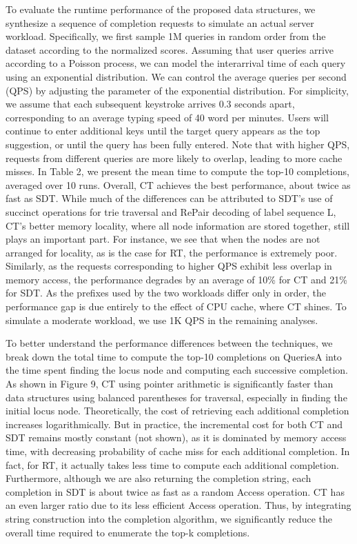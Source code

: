 \documentclass{sig-alternate}
\begin{document}
To evaluate the runtime performance of the proposed data
structures, we synthesize a sequence of completion requests
to simulate an actual server workload. Specifically, we first
sample 1M queries in random order from the dataset according
to the normalized scores. Assuming that user queries
arrive according to a Poisson process, we can model the interarrival
time of each query using an exponential distribution.
We can control the average queries per second (QPS) by
adjusting the  parameter of the exponential distribution.
For simplicity, we assume that each subsequent keystroke
arrives 0.3 seconds apart, corresponding to an average typing
speed of 40 word per minutes. Users will continue to enter
additional keys until the target query appears as the top
suggestion, or until the query has been fully entered. Note
that with higher QPS, requests from different queries are
more likely to overlap, leading to more cache misses.
In Table 2, we present the mean time to compute the top-10
completions, averaged over 10 runs. Overall, CT achieves the
best performance, about twice as fast as SDT. While much
of the differences can be attributed to SDT's use of succinct
operations for trie traversal and RePair decoding of label
sequence L, CT's better memory locality, where all node
information are stored together, still plays an important
part. For instance, we see that when the nodes are not
arranged for locality, as is the case for RT, the performance
is extremely poor. Similarly, as the requests corresponding
to higher QPS exhibit less overlap in memory access, the
performance degrades by an average of 10\% for CT and 21\%
for SDT. As the prefixes used by the two workloads differ only
in order, the performance gap is due entirely to the effect
of CPU cache, where CT shines. To simulate a moderate
workload, we use 1K QPS in the remaining analyses.


To better understand the performance differences between
the techniques, we break down the total time to compute the
top-10 completions on QueriesA into the time spent finding
the locus node and computing each successive completion.
As shown in Figure 9, CT using pointer arithmetic is significantly faster than data structures using balanced parentheses
for traversal, especially in finding the initial locus node. Theoretically,
the cost of retrieving each additional completion
increases logarithmically. But in practice, the incremental
cost for both CT and SDT remains mostly constant (not
shown), as it is dominated by memory access time, with
decreasing probability of cache miss for each additional completion.
In fact, for RT, it actually takes less time to compute
each additional completion. Furthermore, although we are
also returning the completion string, each completion in SDT
is about twice as fast as a random Access operation. CT has
an even larger ratio due to its less efficient Access operation.
Thus, by integrating string construction into the completion
algorithm, we significantly reduce the overall time required to
enumerate the top-k completions.
\end{document}
